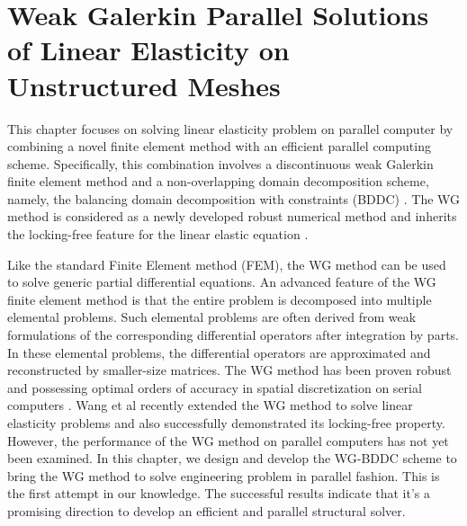 \chapter{Weak Galerkin Parallel Solutions of Linear Elasticity on Unstructured Meshes}

This chapter focuses on solving linear elasticity problem on parallel computer by combining a novel finite element method with an efficient parallel computing scheme. Specifically, this combination involves a discontinuous weak Galerkin finite element method \cite{mu2012weak, li2013weak, wang2014weak, mu2013computational} and a non-overlapping domain decomposition scheme, namely, the balancing domain decomposition with constraints (BDDC) \cite{dohrmann2003preconditioner,tu2007three2d,tu2007three3d}. The WG method is considered as a newly developed robust numerical method and inherits the locking-free feature for the linear elastic equation \cite{wang2016locking}. 

Like the standard Finite Element method (FEM), the WG method can be used to solve generic partial differential equations. An advanced feature of the WG finite element method is that the entire problem is decomposed into multiple elemental problems. Such elemental problems are often derived from weak formulations of the corresponding differential operators after integration by parts. In these elemental problems, the differential operators are approximated and reconstructed by smaller-size matrices. The WG method has been proven robust and possessing optimal orders of accuracy in spatial discretization on serial computers \cite{mu2014weak, Mu2015new}. Wang et al \cite{wang2016locking} recently extended the WG method to solve linear elasticity problems and also successfully demonstrated its locking-free property. However, the performance of the WG method on parallel computers has not yet been examined. In this chapter, we design and develop the WG-BDDC scheme to bring the WG method to solve engineering problem in parallel fashion. This is the first attempt in our knowledge. The successful results indicate that it's a promising direction to develop an efficient and parallel structural solver.



